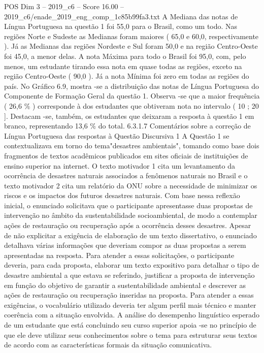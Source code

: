 \begin{textsample}{POS Dim 3 – 2019\_c6 – Score 16.00 – 2019\_c6/enade\_2019\_eng\_comp\_1c85b99fa3.txt}
A Mediana das notas de Língua Portuguesa na questão 1 foi 55,0 para o Brasil, como um todo.
Nas regiões Norte e Sudeste as Medianas foram maiores ( 65,0 e 60,0, respectivamente ).
Já as Medianas das regiões Nordeste e Sul foram 50,0 e na região Centro-Oeste foi 45,0, a menor delas.
A nota Máxima para todo o Brasil foi 95,0, com, pelo menos, um estudante tirando essa nota em quase todas as regiões, exceto na região Centro-Oeste ( 90,0 ).
Já a nota Mínima foi zero em todas as regiões do país.
No Gráfico 6.9, mostra -se a distribuição das notas de Língua Portuguesa do Componente de Formação Geral da questão 1.
Observa -se que a maior frequência ( 26,6 \% ) corresponde à dos estudantes que obtiveram nota no intervalo ( 10 ; 20 ].
Destacam -se, também, os estudantes que deixaram a resposta à questão 1 em branco, representando 13,6 \% do total. 6.3.1.7 Comentários sobre a correção de Língua Portuguesa das respostas à Questão Discursiva 1 A Questão 1 se contextualizava em torno do tema"desastres ambientais", tomando como base dois fragmentos de textos acadêmicos publicados em sites oficiais de instituições de ensino superior na internet.
O texto motivador 1 cita um levantamento da ocorrência de desastres naturais associados a fenômenos naturais no Brasil e o texto motivador 2 cita um relatório da ONU sobre a necessidade de minimizar os riscos e os impactos dos futuros desastres naturais.
Com base nessa reflexão inicial, o enunciado solicitava que o participante apresentasse duas propostas de intervenção no âmbito da sustentabilidade socioambiental, de modo a contemplar ações de restauração ou recuperação após a ocorrência desses desastres.
Apesar de não explicitar a exigência de elaboração de um texto dissertativo, o enunciado detalhava várias informações que deveriam compor as duas propostas a serem apresentadas na resposta.
Para atender a essas solicitações, o participante deveria, para cada proposta, elaborar um texto expositivo para detalhar o tipo de desastre ambiental a que estava se referindo, justificar a proposta de intervenção em função do objetivo de garantir a sustentabilidade ambiental e descrever as ações de restauração ou recuperação inseridas na proposta.
Para atender a essas exigências, o vocabulário utilizado deveria ter algum perfil mais técnico e manter coerência com a situação envolvida.
A análise do desempenho linguístico esperado de um estudante que está concluindo seu curso superior apoia -se no princípio de que ele deve utilizar seus conhecimentos sobre o tema para estruturar seus textos de acordo com as características formais da situação comunicativa.

\end{textsample}

